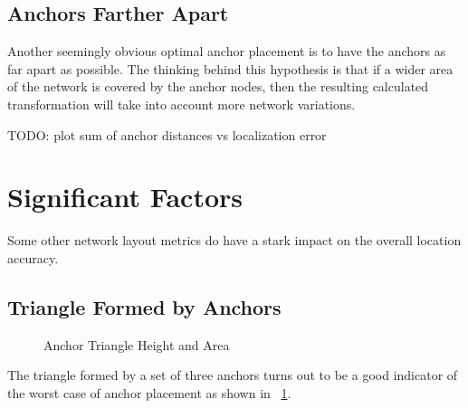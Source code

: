 \subsection{Anchors Farther Apart}

Another seemingly obvious optimal anchor placement is to have the anchors as far apart as possible.  The thinking behind this hypothesis is that if a wider area of the network is covered by the anchor nodes, then the resulting calculated transformation will take into account more network variations.  

TODO: plot sum of anchor distances vs localization error

\section{Significant Factors}

Some other network layout metrics do have a stark impact on the overall location accuracy.

\subsection{Triangle Formed by Anchors}

\begin{figure}
  \centering
    \caption{Anchor Triangle Height and Area}
    \label{fig:TriangleAreaHeight1}
\end{figure}

The triangle formed by a set of three anchors turns out to be a good indicator of the worst case of anchor placement as shown in ~\ref{fig:TriangleAreaHeight1}.
